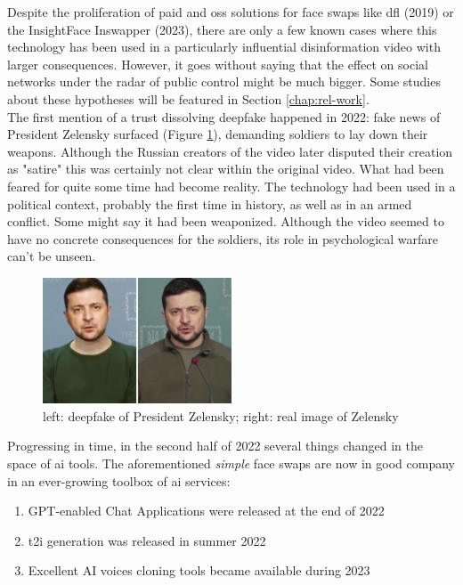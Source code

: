\documentclass[
  a4paper,  %
  twoside,  %
  bibliography=totoc,
  headsepline,
  cleardoublepage=empty,
  parskip=half,
  draft=false
]{scrbook}
\begin{document}
Despite the proliferation of paid and \gls{oss} solutions for face swaps like \gls{dfl} (2019) or the InsightFace Inswapper (2023), there are only a few known cases where this technology has been used in a particularly influential disinformation video with larger consequences. However, it goes without saying that the effect on social networks under the radar of public control might be much bigger. Some studies about these hypotheses will be featured in Section \ref{chap:rel-work}. \\
The first mention of a trust dissolving deepfake happened in 2022: fake news of President Zelensky surfaced (Figure \ref{fig:zelensky-Deepfake}), demanding soldiers to lay down their weapons. Although the Russian creators of the video later disputed their creation as "satire" this was certainly not clear within the original video. What had been feared for quite some time had become reality. The technology had been used in a political context, probably the first time in history, as well as in an armed conflict. Some might say it had been weaponized. Although the video seemed to have no concrete consequences for the soldiers, its role in psychological warfare can't be unseen.
\begin{figure}[h]
  \centering
  \includegraphics[width=0.5\textwidth]{./graphics/images/Zelensky.jpg}
  \caption{left: deepfake of President Zelensky; right: real image of Zelensky \cite{universityofvirginiaZelenskyySurrenderHoax2022}}
  \label{fig:zelensky-Deepfake}
\end{figure}
Progressing in time, in the second half of 2022 several things changed in the space of \gls{ai} tools. The aforementioned \textit{simple} face swaps are now in good company in an ever-growing toolbox of \gls{ai} services: 
\begin{enumerate}
  \item GPT-enabled Chat Applications were released at the end of 2022
  \item \gls{t2i} generation was released in summer 2022
  \item Excellent AI voices cloning tools became available during 2023
\end{enumerate}
\end{document}
